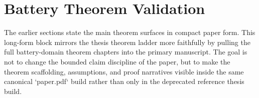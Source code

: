 \section{Battery Theorem Validation}\label{sec:theorem_validation_longform}\label{app:integrated-theorem-surface-register}

The earlier sections state the main theorem surfaces in compact paper form.
This long-form block mirrors the thesis theorem ladder more faithfully by
pulling the full battery-domain theorem chapters into the primary manuscript.
The goal is not to change the bounded claim discipline of the paper, but to
make the theorem scaffolding, assumptions, and proof narratives visible inside
the same canonical `paper.pdf` build rather than only in the deprecated
reference thesis build.


